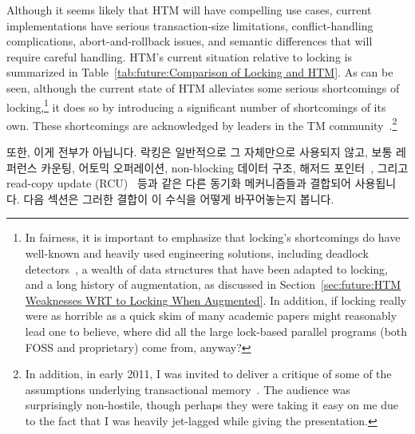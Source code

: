 Although it seems likely that HTM will have compelling use cases,
current implementations have serious transaction-size limitations,
conflict-handling complications, abort-and-rollback issues, and
semantic differences that will require careful handling.
HTM's current situation relative to locking is summarized in
Table~\ref{tab:future:Comparison of Locking and HTM}.
As can be seen, although the current state of HTM alleviates some
serious shortcomings of locking,\footnote{
	In fairness, it is important to emphasize that locking's shortcomings
	do have well-known and heavily used engineering solutions, including
	deadlock detectors~\cite{JonathanCorbet2006lockdep}, a wealth
	of data structures that have been adapted to locking, and
	a long history of augmentation, as discussed in
	Section~\ref{sec:future:HTM Weaknesses WRT to Locking When Augmented}.
	In addition, if locking really were as horrible as a quick skim
	of many academic papers might reasonably lead one to believe,
	where did all the large lock-based parallel programs (both
	FOSS and proprietary) come from, anyway?}
it does so by introducing a significant
number of shortcomings of its own.
These shortcomings are acknowledged by leaders in the TM
community~\cite{AlexanderMatveev2012PessimisticTM}.\footnote{
	In addition, in early 2011, I was invited to deliver a critique of
	some of the assumptions underlying transactional
	memory~\cite{PaulEMcKenney2011Verico}.
	The audience was surprisingly non-hostile, though perhaps they
	were taking it easy on me due to the fact that I was heavily
	jet-lagged while giving the presentation.}
\fi

또한, 이게 전부가 아닙니다.
락킹은 일반적으로 그 자체만으로 사용되지 않고, 보통 레퍼런스 카운팅, 어토믹
오퍼레이션, non-blocking 데이터 구조, 해저드
포인터~\cite{MagedMichael04a,HerlihyLM02}, 그리고 read-copy update
(RCU)~\cite{McKenney98,McKenney01a,ThomasEHart2007a,PaulEMcKenney2012ELCbattery}
등과 같은 다른 동기화 메커니즘들과 결합되어 사용됩니다.
다음 섹션은 그러한 결합이 이 수식을 어떻게 바꾸어놓는지 봅니다.
\iffalse

In addition, this is not the whole story.
Locking is not normally used by itself, but is instead typically
augmented by other synchronization mechanisms,
including reference counting, atomic operations, non-blocking data structures,
hazard pointers~\cite{MagedMichael04a,HerlihyLM02},
and RCU~\cite{McKenney98,McKenney01a,ThomasEHart2007a,PaulEMcKenney2012ELCbattery}.
The next section looks at how such augmentation changes the equation.
\fi

